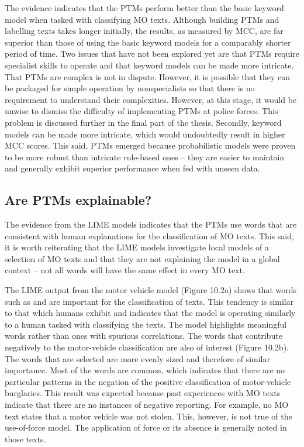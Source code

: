 The evidence indicates that the PTMs perform better than the basic keyword model when tasked with classifying MO texts. Although building PTMs and labelling texts takes longer initially, the results, as measured by MCC, are far superior than those of using the basic keyword models for a comparably shorter period of time. Two issues that have not been explored yet are that PTMs require specialist skills to operate and that keyword models can be made more intricate. That PTMs are complex is not in dispute. However, it is possible that they can be packaged for simple operation by nonspecialists so that there is no requirement to understand their complexities. However, at this stage, it would be unwise to dismiss the difficulty of implementing PTMs at police forces. This problem is discussed further in the final part of the thesis. Secondly, keyword models can be made more intricate, which would undoubtedly result in higher MCC scores. This said, PTMs emerged because probabilistic models were proven to be more robust than intricate rule-based ones – they are easier to maintain and generally exhibit superior performance when fed with unseen data.

\subsection{Are PTMs explainable?} The evidence from the LIME models indicates that the PTMs use words that are consistent with human explanations for the classification of MO texts. This said, it is worth reiterating that the LIME models investigate local models of a selection of MO texts and that they are not explaining the model in a global context – not all words will have the same effect in every MO text. 

The LIME output from the motor vehicle model (Figure 10.2a) shows that words such as  and  are important for the classification of texts. This tendency is similar to that which humans exhibit and indicates that the model is operating similarly to a human tasked with classifying the texts. The model highlights meaningful words rather than ones with spurious correlations. The words that contribute negatively to the motor-vehicle classification are also of interest (Figure 10.2b). The words that are selected are more evenly sized and therefore of similar importance. Most of the words are common, which indicates that there are no particular patterns in the negation of the positive classification of motor-vehicle burglaries. This result was expected because past experiences with MO texts indicate that there are no instances of negative reporting. For example, no MO text states that a motor vehicle was not stolen. This, however, is not true of the use-of-force model. The application of force or its absence is generally noted in those texts.


